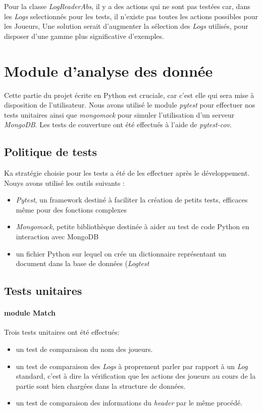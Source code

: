 Pour la classe \textit{LogReaderAbs}, il y a des actions qui ne sont pas testées car, dans les \textit{Logs} selectionnés pour les tests, il n'existe pas toutes les actions possibles pour les Joueurs, Une solution serait d'augmenter la sélection des \textit{Logs} utilisés, pour disposer d'une gamme plus significative d'exemples.


\section{Module d'analyse des donnée}
Cette partie du projet écrite en Python est cruciale, car c'est elle qui sera mise à disposition de  l'utilisateur. Nous avons utilisé le module \textit{pytest} pour effectuer nos tests unitaires ainsi que \textit{mongomock} pour simuler l'utilisation d'un serveur \textit{MongoDB}. Les tests de couverture ont été effectués à l'aide de \textit{pytest-cov}.

\subsection{Politique de tests}
Ka stratégie choisie pour les tests a été de les effectuer après le développement. Nouys avons utilisé les outils suivants : 
\begin{itemize}
\item \textit{Pytest}, un framework destiné à faciliter la création de petits tests, efficaces même pour des fonctions complexes
\item \textit{Mongomock}, petite bibliothèque destinée à aider au test de code Python en interaction avec MongoDB
\item un fichier Python sur lequel on crée un dictionnaire représentant un document dans la base de données (\textit{Logtest}
\end{itemize}

\subsection{Tests unitaires}
\paragraph{module Match}
Trois tests unitaires ont été effectués:
\begin{itemize}
\item un test de comparaison du nom des joueurs.
\item un test de comparaison des \textit{Logs} à proprement parler par rapport à un \textit{Log} standard, c'est à dire la vérification que les actions des joueurs au cours de la partie sont bien chargées dans la structure de données. 
\item un test de comparaison des informations du \textit{header} par le même procédé.
\end{itemize}

